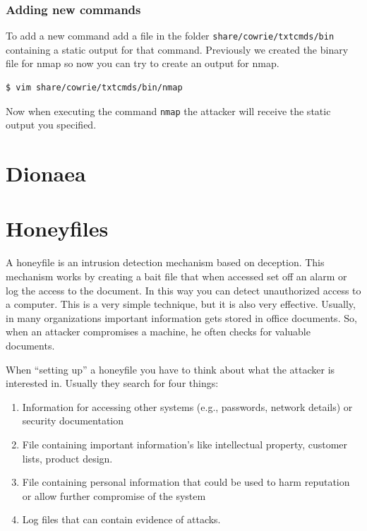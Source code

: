 \documentclass[epsfig,a4paper,11pt,titlepage,oneside,openany]{book}
\begin{document}
\subsection{Adding new commands}

To add a new command add a file in the folder \texttt{share/cowrie/txtcmds/bin} containing a static output for that command. Previously we created the binary file for nmap so now you can try to create an output for nmap.
\begin{lstlisting}[language=bash]
$ vim share/cowrie/txtcmds/bin/nmap
\end{lstlisting}
Now when executing the command \texttt{nmap} the attacker will receive the static output you specified.

\chapter{Dionaea}

\chapter{Honeyfiles}

A honeyfile is an intrusion detection mechanism based on deception. This mechanism works by creating a bait file that when accessed set off an alarm or log the access to the document. In this way you can detect unauthorized access to a computer. This is a very simple technique, but it is also very effective. Usually, in many organizations important information gets stored in office documents. So, when an attacker compromises a machine, he often checks for valuable documents.

When “setting up” a honeyfile you have to think about what the attacker is interested in. Usually they search for four things:
\begin{enumerate}
\itemsep0em 
\item Information for accessing other systems (e.g., passwords, network details) or security documentation
\item File containing important information's like intellectual property, customer lists, product design.
\item File containing personal information that could be  used to harm reputation or allow further compromise of the system
\item Log files that can contain evidence of attacks.
\end{enumerate}
\end{document}
